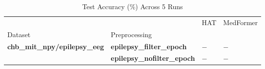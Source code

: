 \begin{table}
\caption{Test Accuracy (\%) Across 5 Runs}
\label{tab:results_acc}
\begin{tabular}{llll}
\toprule
 &  & HAT & MedFormer \\
Dataset & Preprocessing &  &  \\
\midrule
\multirow[t]{2}{*}{\textbf{chb_mit_npy/epilepsy_eeg}} & \textbf{epilepsy_filter_epoch} & $-$ & $-$ \\
\textbf{} & \textbf{epilepsy_nofilter_epoch} & $-$ & $-$ \\
\cline{1-4}
\bottomrule
\end{tabular}
\end{table}
